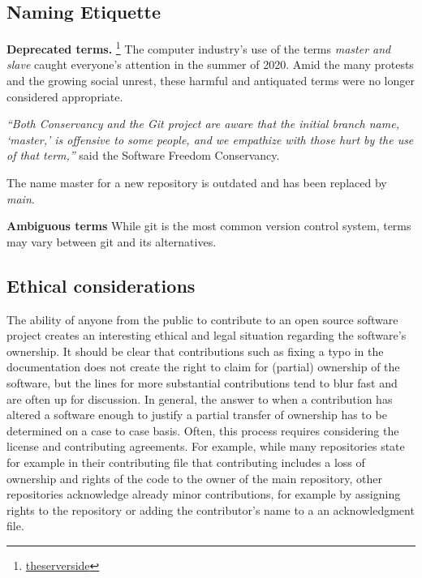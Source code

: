 \documentclass[
  letterpaper,
  DIV=11,
  numbers=noendperiod]{scrreport}
\begin{document}
\hypertarget{naming-etiquette}{%
\subsection{Naming Etiquette}\label{naming-etiquette}}

\textbf{Deprecated terms.} \footnote{\href{https://www.theserverside.com/feature/Why-GitHub-renamed-its-master-branch-to-main\#:~:text=The\%20master\%20branch\%20is\%20no,like\%20any\%20other\%20Git\%20branch.}{theserverside}}
The computer industry's use of the terms \emph{master and slave} caught
everyone's attention in the summer of 2020. Amid the many protests and
the growing social unrest, these harmful and antiquated terms were no
longer considered appropriate.

\emph{``Both Conservancy and the Git project are aware that the initial
branch name, `master,' is offensive to some people, and we empathize
with those hurt by the use of that term,''} said the Software Freedom
Conservancy.

The name master for a new repository is outdated and has been replaced
by \emph{main}.

\textbf{Ambiguous terms} While git is the most common version control
system, terms may vary between git and its alternatives.

\hypertarget{ethical-considerations}{%
\subsection{Ethical considerations}\label{ethical-considerations}}

The ability of anyone from the public to contribute to an open source
software project creates an interesting ethical and legal situation
regarding the software's ownership. It should be clear that
contributions such as fixing a typo in the documentation does not create
the right to claim for (partial) ownership of the software, but the
lines for more substantial contributions tend to blur fast and are often
up for discussion. In general, the answer to when a contribution has
altered a software enough to justify a partial transfer of ownership has
to be determined on a case to case basis. Often, this process requires
considering the license and contributing agreements. For example, while
many repositories state for example in their contributing file that
contributing includes a loss of ownership and rights of the code to the
owner of the main repository, other repositories acknowledge already
minor contributions, for example by assigning rights to the repository
or adding the contributor's name to a an acknowledgment file.
\end{document}
